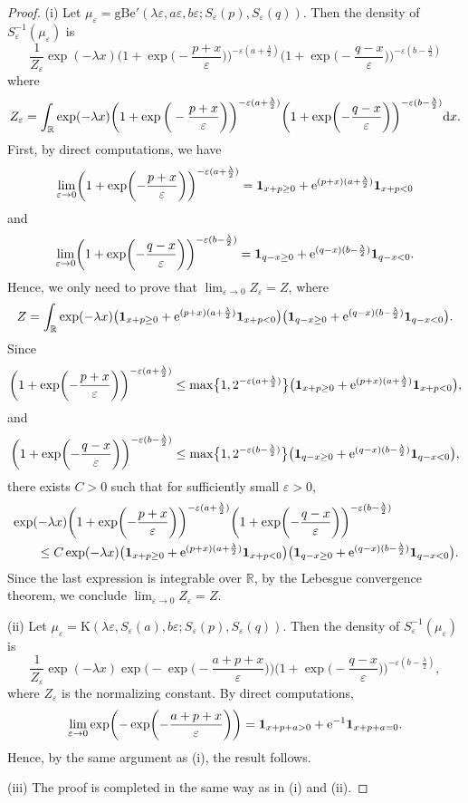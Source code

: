\documentclass[pdftex]{sigma}
\numberwithin{equation}{section}
\def\R{\mathbb{R}}
\def\e{\varepsilon}
\newcommand{\la}{\lambda}
\begin{document}
\begin{proof}
(i) Let $\mu_{\e}=\mathrm{gBe}'(\la \e, a\e ,b \e; S_{\e}(p), S_{\e}(q))$. Then the density of $S_{\e}^{-1}(\mu_{\e})$ is
\[
\frac{1}{Z_{\e}}\exp(-\la x) \biggl(1 +\exp\biggl(-\frac{p+x}{\e}\biggr)\biggr)^{-\e(a+\frac{\la}{2})}\biggl(1 +\exp\biggl(-\frac{q-x}{\e}\biggr)\biggr)^{-\e(b-\frac{\la}{2})}
 \]
 where
 \[
 Z_{\e}=\int_{\R}\exp(-\la x) \biggl(1 +\exp\bigg(-\frac{p+x}{\e}\biggr)\biggr)^{-\e(a+\frac{\la}{2})}\biggl(1 +\exp\biggl(-\frac{q-x}{\e}\biggr)\biggr)^{-\e(b-\frac{\la}{2})} {\rm d}x.
 \]
 First, by direct computations, we have
 \[
 \lim_{\e \to 0}\biggl(1 +\exp\biggl(-\frac{p+x}{\e}\biggr)\biggr)^{-\e(a+\frac{\la}{2})}= \mathbf{1}_{x+p \ge 0} + {\rm e}^{ (p+x)(a+\frac{\la}{2})}\mathbf{1}_{x+p < 0}
 \]
 and
 \[
 \lim_{\e \to 0}\biggl(1 +\exp\biggl(-\frac{q-x}{\e}\biggr)\biggr)^{-\e(b-\frac{\la}{2})}= \mathbf{1}_{q-x \ge 0} + {\rm e}^{ (q-x)(b-\frac{\la}{2})}\mathbf{1}_{q-x < 0}.
 \]
 Hence, we only need to prove that $ \lim_{\e \to 0}Z_{\e}=Z$, where
 \[
 Z=\int_{\R} \exp(-\la x)\bigl( \mathbf{1}_{x+p \ge 0} + {\rm e}^{ (p+x)(a+\frac{\la}{2})}\mathbf{1}_{x+p < 0}
 \bigr)\bigl( \mathbf{1}_{q-x \ge 0} + {\rm e}^{ (q-x)(b-\frac{\la}{2})}\mathbf{1}_{q-x < 0}\bigr).
 \]
 Since
 \[
\biggl(1 +\exp\biggl(-\frac{p+x}{\e}\biggr)\biggr)^{-\e(a+\frac{\la}{2})} \le \max \bigl\{1, 2^{-\e(a+\frac{\la}{2})} \bigr\} \bigl( \mathbf{1}_{x+p \ge 0} + {\rm e}^{ (p+x)(a+\frac{\la}{2})}\mathbf{1}_{x+p < 0}
 \bigr),
 \]
 and
 \[
\biggl(1 +\exp\biggl(-\frac{q-x}{\e}\biggr)\biggr)^{-\e(b-\frac{\la}{2})} \le \max \bigl\{1, 2^{-\e(b-\frac{\la}{2})} \bigr\} \bigl( \mathbf{1}_{q-x \ge 0} + {\rm e}^{ (q-x)(b-\frac{\la}{2})}\mathbf{1}_{q-x < 0}
 \bigr),
 \]
 there exists $C>0$ such that for sufficiently small $\e>0$,
 \begin{align*}
 &\exp(-\la x) \biggl(1 +\exp\biggl(-\frac{p+x}{\e}\biggr)\biggr)^{-\e(a+\frac{\la}{2})}\biggl(1 +\exp\biggl(-\frac{q-x}{\e}\biggr)\biggr)^{-\e(b-\frac{\la}{2})} \\
 &\qquad{} \le C \exp(-\la x)\bigl( \mathbf{1}_{x+p \ge 0} + {\rm e}^{ (p+x)(a+\frac{\la}{2})}\mathbf{1}_{x+p < 0}
 \bigr)\bigl( \mathbf{1}_{q-x \ge 0} + {\rm e}^{ (q-x)(b-\frac{\la}{2})}\mathbf{1}_{q-x < 0}
 \bigr).
 \end{align*}
 Since the last expression is integrable over $\R$, by the Lebesgue convergence theorem, we conclude $\lim_{\e \to 0}Z_{\e}=Z$.

 (ii)
 Let $\mu_{\e}=\mathrm{K}(\la \e, S_{\e}(a) ,b \e; S_{\e}(p), S_{\e}(q))$. Then the density of $S_{\e}^{-1}(\mu_{\e})$ is
\[
\frac{1}{Z_{\e}}\exp(-\la x) \exp\biggl(-\exp\biggl(-\frac{a+p+x}{\e}\biggr)\biggr)\biggl(1 +\exp\biggl(-\frac{q-x}{\e}\biggr)\biggr)^{-\e(b-\frac{\la}{2})},
 \]
 where $Z_{\e}$ is the normalizing constant. By direct computations,
 \[
 \lim_{\e \to 0}\exp\biggl(-\exp\biggl(-\frac{a+p+x}{\e}\biggr)\biggr)= \mathbf{1}_{x+p+a > 0} + {\rm e}^{-1}\mathbf{1}_{x+p+a = 0}.
 \]
 Hence, by the same argument as (i), the result follows.

 (iii) The proof is completed in the same way as in (i) and (ii).
 \end{proof}
\end{document}
